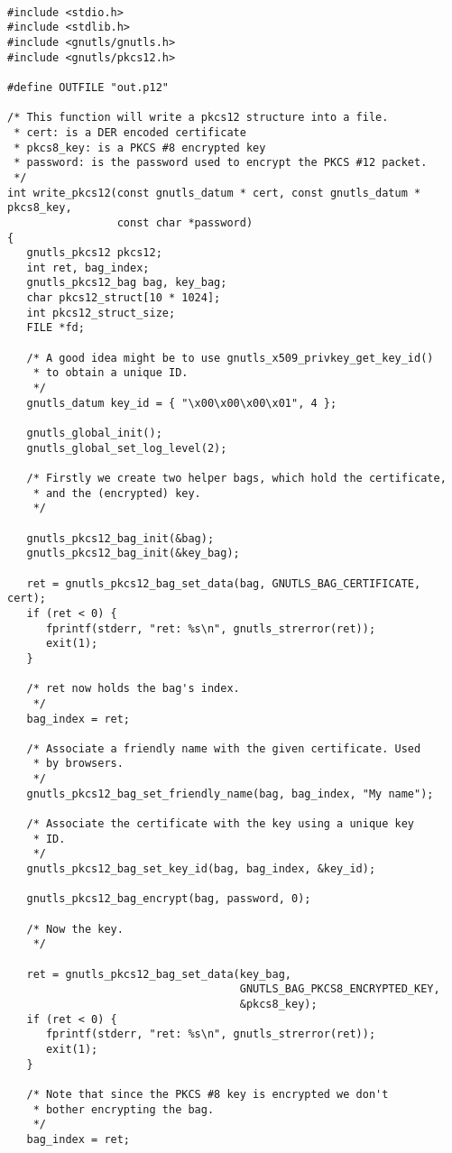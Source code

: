 \begin{verbatim}

#include <stdio.h>
#include <stdlib.h>
#include <gnutls/gnutls.h>
#include <gnutls/pkcs12.h>

#define OUTFILE "out.p12"

/* This function will write a pkcs12 structure into a file.
 * cert: is a DER encoded certificate
 * pkcs8_key: is a PKCS #8 encrypted key
 * password: is the password used to encrypt the PKCS #12 packet.
 */
int write_pkcs12(const gnutls_datum * cert, const gnutls_datum * pkcs8_key,
                 const char *password)
{
   gnutls_pkcs12 pkcs12;
   int ret, bag_index;
   gnutls_pkcs12_bag bag, key_bag;
   char pkcs12_struct[10 * 1024];
   int pkcs12_struct_size;
   FILE *fd;

   /* A good idea might be to use gnutls_x509_privkey_get_key_id()
    * to obtain a unique ID.
    */
   gnutls_datum key_id = { "\x00\x00\x00\x01", 4 };

   gnutls_global_init();
   gnutls_global_set_log_level(2);

   /* Firstly we create two helper bags, which hold the certificate,
    * and the (encrypted) key.
    */

   gnutls_pkcs12_bag_init(&bag);
   gnutls_pkcs12_bag_init(&key_bag);

   ret = gnutls_pkcs12_bag_set_data(bag, GNUTLS_BAG_CERTIFICATE, cert);
   if (ret < 0) {
      fprintf(stderr, "ret: %s\n", gnutls_strerror(ret));
      exit(1);
   }

   /* ret now holds the bag's index.
    */
   bag_index = ret;

   /* Associate a friendly name with the given certificate. Used
    * by browsers.
    */
   gnutls_pkcs12_bag_set_friendly_name(bag, bag_index, "My name");

   /* Associate the certificate with the key using a unique key
    * ID.
    */
   gnutls_pkcs12_bag_set_key_id(bag, bag_index, &key_id);

   gnutls_pkcs12_bag_encrypt(bag, password, 0);

   /* Now the key.
    */

   ret = gnutls_pkcs12_bag_set_data(key_bag,
                                    GNUTLS_BAG_PKCS8_ENCRYPTED_KEY,
                                    &pkcs8_key);
   if (ret < 0) {
      fprintf(stderr, "ret: %s\n", gnutls_strerror(ret));
      exit(1);
   }

   /* Note that since the PKCS #8 key is encrypted we don't
    * bother encrypting the bag.
    */
   bag_index = ret;


\end{verbatim}
